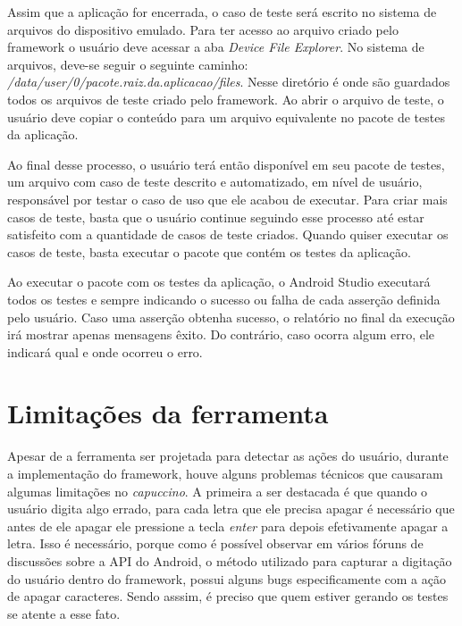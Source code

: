\documentclass[
    12pt,       %
    openright,      %
    twoside,      %
    a4paper,      %
    english,      %
    french,       %
    spanish,      %
    brazil,       %
    ]{abntex2}
\begin{document}
        Assim que a aplicação for encerrada, o caso de teste será escrito no sistema de arquivos do dispositivo
        emulado. Para ter acesso ao arquivo criado pelo framework o usuário deve acessar a aba
        \textit{Device File Explorer}. No sistema de arquivos, deve-se seguir o seguinte caminho:
        \textit{/data/user/0/pacote.raiz.da.aplicacao/files}. Nesse diretório é onde são guardados todos os
        arquivos de teste criado pelo framework. Ao abrir o arquivo de teste, o usuário deve copiar o conteúdo
        para um arquivo equivalente no pacote de testes da aplicação.

        Ao final desse processo, o usuário terá então disponível em seu pacote de testes, um arquivo com caso
        de teste descrito e automatizado, em nível de usuário, responsável por testar o caso de uso que ele
        acabou de executar. Para criar mais casos de teste, basta que o usuário continue seguindo esse
        processo até estar satisfeito com a quantidade de casos de teste criados. Quando quiser executar
        os casos de teste, basta executar o pacote que contém os testes da aplicação.

        Ao executar o pacote com os testes da aplicação, o Android Studio executará todos os testes e sempre
        indicando o sucesso ou falha de cada asserção definida pelo usuário. Caso uma asserção obtenha sucesso,
        o relatório no final da execução irá mostrar apenas mensagens êxito. Do contrário, caso ocorra algum
        erro, ele indicará qual e onde ocorreu o erro.

      \section{Limitações da ferramenta}
        Apesar de a ferramenta ser projetada para detectar as ações do usuário, durante a implementação
        do framework, houve alguns problemas técnicos que causaram algumas limitações no \textit{capuccino}.
        A primeira a ser destacada é que quando o usuário digita algo errado, para cada
        letra que ele precisa apagar é necessário que antes de ele apagar ele pressione a tecla \textit{enter}
        para depois efetivamente apagar a letra. Isso é necessário, porque como é possível observar em vários
        fóruns de discussões sobre a API do Android, o método utilizado para capturar a digitação do usuário
        dentro do framework, possui alguns bugs especificamente com a ação de apagar caracteres. Sendo asssim,
        é preciso que quem estiver gerando os testes se atente a esse fato.
\end{document}
